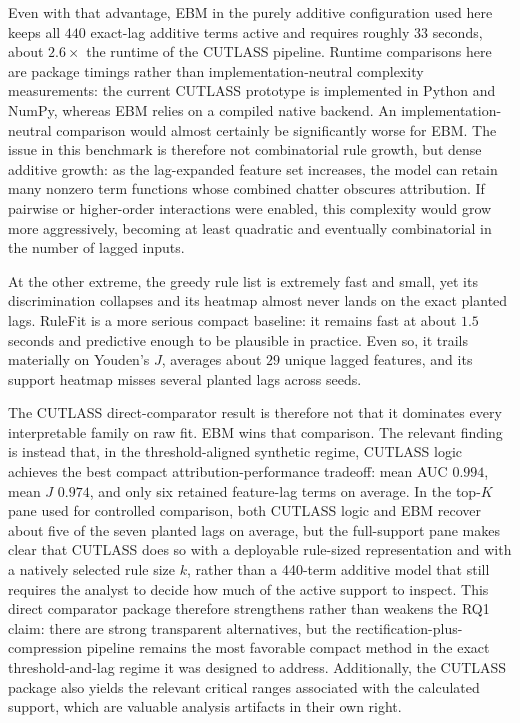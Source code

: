 Even with that advantage, EBM in the purely additive configuration used here keeps all $440$ exact-lag additive terms active and requires roughly $33$ seconds, about $2.6\times$ the runtime of the CUTLASS pipeline. Runtime comparisons here are package timings rather than implementation-neutral complexity measurements: the current CUTLASS prototype is implemented in Python and NumPy, whereas EBM relies on a compiled native backend. An implementation-neutral comparison would almost certainly be significantly worse for EBM. The issue in this benchmark is therefore not combinatorial rule growth, but dense additive growth: as the lag-expanded feature set increases, the model can retain many nonzero term functions whose combined chatter obscures attribution. If pairwise or higher-order interactions were enabled, this complexity would grow more aggressively, becoming at least quadratic and eventually combinatorial in the number of lagged inputs.

At the other extreme, the greedy rule list is extremely fast and small, yet its discrimination collapses and its heatmap almost never lands on the exact planted lags. RuleFit is a more serious compact baseline: it remains fast at about $1.5$ seconds and predictive enough to be plausible in practice. Even so, it trails materially on Youden's $J$, averages about $29$ unique lagged features, and its support heatmap misses several planted lags across seeds.

The CUTLASS direct-comparator result is therefore not that it dominates every interpretable family on raw fit. EBM wins that comparison. The relevant finding is instead that, in the threshold-aligned synthetic regime, CUTLASS logic achieves the best compact attribution-performance tradeoff: mean AUC $0.994$, mean $J$ $0.974$, and only six retained feature-lag terms on average. In the top-$K$ pane used for controlled comparison, both CUTLASS logic and EBM recover about five of the seven planted lags on average, but the full-support pane makes clear that CUTLASS does so with a deployable rule-sized representation and with a natively selected rule size $k$, rather than a 440-term additive model that still requires the analyst to decide how much of the active support to inspect. This direct comparator package therefore strengthens rather than weakens the RQ1 claim: there are strong transparent alternatives, but the rectification-plus-compression pipeline remains the most favorable compact method in the exact threshold-and-lag regime it was designed to address.  Additionally, the CUTLASS package also yields the relevant critical ranges associated with the calculated support, which are valuable analysis artifacts in their own right.

